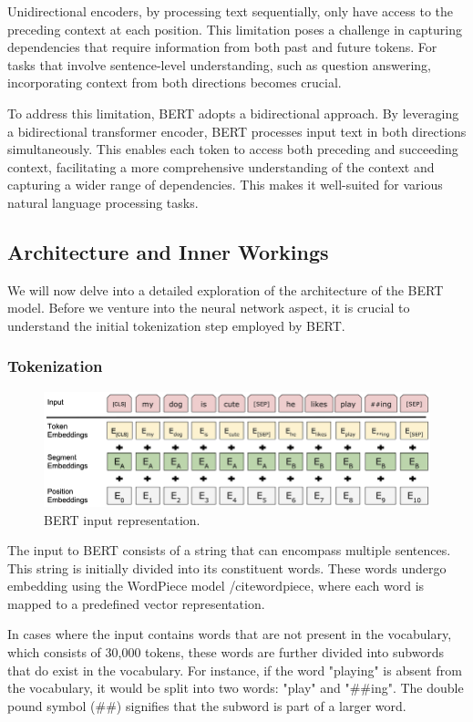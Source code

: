 \documentclass[a4paper,12pt]{report} %
\begin{document}
Unidirectional encoders, by processing text sequentially, only have access to the preceding context at each position. This limitation poses a challenge in capturing dependencies that require information from both past and future tokens. For tasks that involve sentence-level understanding, such as question answering, incorporating context from both directions becomes crucial.

To address this limitation, BERT adopts a bidirectional approach. By leveraging a bidirectional transformer encoder, BERT processes input text in both directions simultaneously. This enables each token to access both preceding and succeeding context, facilitating a more comprehensive understanding of the context and capturing a wider range of dependencies. This makes it well-suited for various natural language processing tasks.


\subsection{Architecture and Inner Workings}
We will now delve into a detailed exploration of the architecture of the BERT model. Before we venture into the neural network aspect, it is crucial to understand the initial tokenization step employed by BERT.

\subsubsection{Tokenization}
\begin{figure}
  \centering
  \includegraphics[width=12cm]{img/bert_input_representation.png}
  \caption{BERT input representation.}
  \label{fig:bert_architecture}
\end{figure}
The input to BERT consists of a string that can encompass multiple sentences. This string is initially divided into its constituent words. These words undergo embedding using the WordPiece model /cite{wordpiece}, where each word is mapped to a predefined vector representation.

In cases where the input contains words that are not present in the vocabulary, which consists of 30,000 tokens, these words are further divided into subwords that do exist in the vocabulary. For instance, if the word "playing" is absent from the vocabulary, it would be split into two words: "play" and "\#\#ing". The double pound symbol (\#\#) signifies that the subword is part of a larger word.
\end{document}
